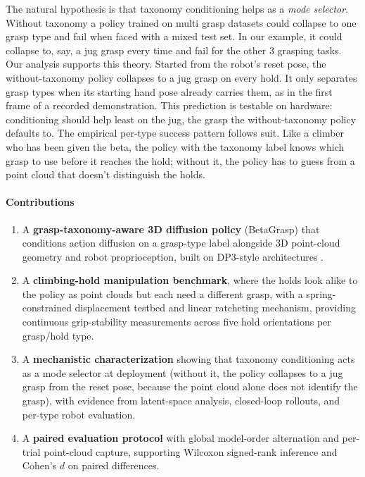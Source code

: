 \documentclass[letterpaper, 10pt, journal, twoside]{IEEEtran}
\begin{document}
The natural hypothesis is that taxonomy conditioning helps as a \emph{mode selector}.
Without taxonomy a policy trained on multi grasp datasets could collapse to one grasp
type and fail when faced with a mixed test set. In our example, it could collapse to,
say, a jug grasp every time and fail for the other 3 grasping tasks. Our analysis
supports this theory. Started from the robot's reset pose, the without-taxonomy policy
collapses to a jug grasp on every hold. It only separates grasp types when its starting
hand pose already carries them, as in the first frame of a recorded demonstration. This
prediction is testable on hardware: conditioning should help least on the jug, the
grasp the without-taxonomy policy defaults to. The
empirical per-type success pattern follows suit. Like a climber who has been given the
beta, the policy with the taxonomy label knows which grasp to use before it reaches the
hold; without it, the policy has to guess from a point cloud that doesn't distinguish
the holds.

\paragraph*{Contributions}
\begin{enumerate}
  \item A \textbf{grasp-taxonomy-aware 3D diffusion policy} (BetaGrasp) that
    conditions action diffusion on a grasp-type label alongside 3D point-cloud
    geometry and robot proprioception, built on DP3-style architectures
    \cite{ze2024dp3}.
  \item A \textbf{climbing-hold manipulation benchmark}, where the holds look alike to
    the policy as point clouds but each need a different grasp, with a
    spring-constrained displacement testbed and linear ratcheting mechanism, providing continuous
    grip-stability measurements across five hold orientations per grasp/hold type.
  \item A \textbf{mechanistic characterization} showing that taxonomy conditioning
    acts as a mode selector at deployment (without it, the policy collapses to a jug
    grasp from the reset pose, because the point cloud alone does not identify the
    grasp), with evidence from latent-space
    analysis, closed-loop rollouts, and per-type robot evaluation.
  \item A \textbf{paired evaluation protocol} with global model-order
    alternation and per-trial point-cloud capture, supporting Wilcoxon signed-rank
    inference and Cohen's $d$ on paired differences.
\end{enumerate}
\end{document}
